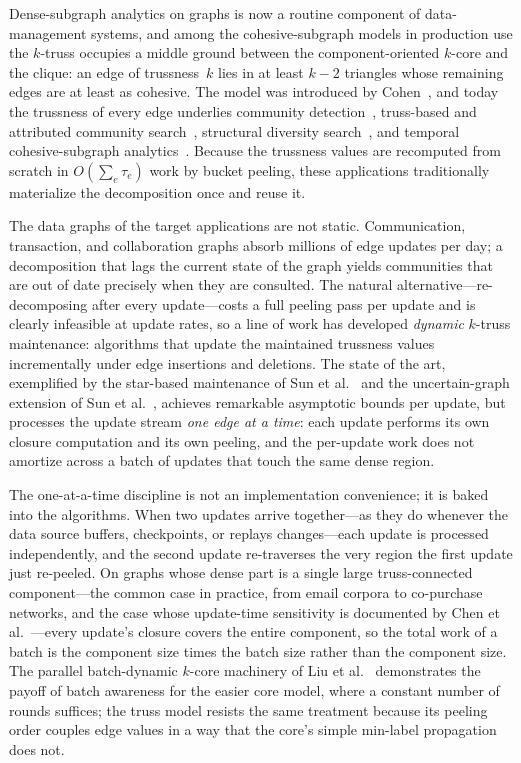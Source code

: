 Dense-subgraph analytics on graphs is now a routine component of data-management systems, and among the cohesive-subgraph models in production use the $k$-truss occupies a middle ground between the component-oriented $k$-core and the clique: an edge of trussness~$k$ lies in at least $k-2$ triangles whose remaining edges are at least as cohesive.
The model was introduced by Cohen~\cite{cohen2019trusses}, and today the trussness of every edge underlies community detection~\cite{conte2020truly}, truss-based and attributed community search~\cite{huang2016attribute,behrouz2022firmtruss}, structural diversity search~\cite{huang2020trussbased}, and temporal cohesive-subgraph analytics~\cite{lotito2020efficient,saryce2025powerful}.
Because the trussness values are recomputed from scratch in $O(\sum_e \tau_e)$ work by bucket peeling, these applications traditionally materialize the decomposition once and reuse it.

The data graphs of the target applications are not static.
Communication, transaction, and collaboration graphs absorb millions of edge updates per day; a decomposition that lags the current state of the graph yields communities that are out of date precisely when they are consulted.
The natural alternative---re-decomposing after every update---costs a full peeling pass per update and is clearly infeasible at update rates, so a line of work has developed \emph{dynamic} $k$-truss maintenance: algorithms that update the maintained trussness values incrementally under edge insertions and deletions.
The state of the art, exemplified by the star-based maintenance of Sun et al.~\cite{sun2023efficient} and the uncertain-graph extension of Sun et al.~\cite{sun2025probabilistic}, achieves remarkable asymptotic bounds per update, but processes the update stream \emph{one edge at a time}: each update performs its own closure computation and its own peeling, and the per-update work does not amortize across a batch of updates that touch the same dense region.

The one-at-a-time discipline is not an implementation convenience; it is baked into the algorithms.
When two updates arrive together---as they do whenever the data source buffers, checkpoints, or replays changes---each update is processed independently, and the second update re-traverses the very region the first update just re-peeled.
On graphs whose dense part is a single large truss-connected component---the common case in practice, from email corpora to co-purchase networks, and the case whose update-time sensitivity is documented by Chen et al.~\cite{chen2021breaking}---every update's closure covers the entire component, so the total work of a batch is the component size times the batch size rather than the component size.
The parallel batch-dynamic $k$-core machinery of Liu et al.~\cite{liu2022parallel} demonstrates the payoff of batch awareness for the easier core model, where a constant number of rounds suffices; the truss model resists the same treatment because its peeling order couples edge values in a way that the core's simple min-label propagation does not.

